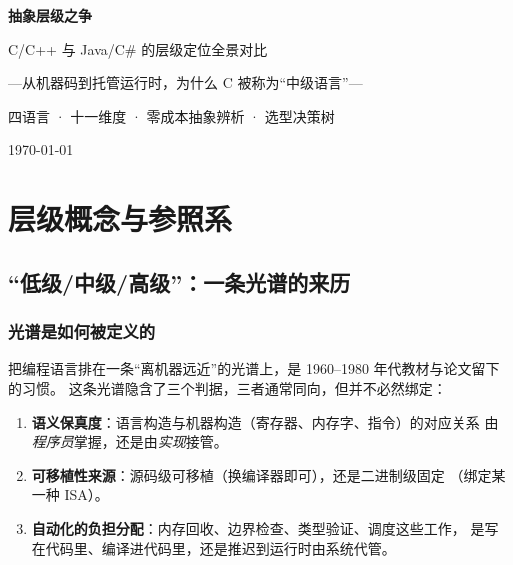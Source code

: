 \documentclass[12pt,a4paper,fontset=fandol]{ctexbook}
\begin{document}
\frontmatter

\begin{titlepage}
\centering
\vspace*{3.5cm}
{\Huge\bfseries 抽象层级之争\par}
\vspace{0.8cm}
{\LARGE C/C++ 与 Java/C\# 的层级定位全景对比\par}
\vspace{0.5cm}
{\large ---从机器码到托管运行时，为什么 C 被称为``中级语言''---\par}
\vfill
{\normalsize 四语言 · 十一维度 · 零成本抽象辨析 · 选型决策树\par}
\vspace{0.5cm}
{\large \today\par}
\end{titlepage}

\tableofcontents

\mainmatter

\part{层级概念与参照系}

\chapter{``低级/中级/高级''：一条光谱的来历}

\section{光谱是如何被定义的}

把编程语言排在一条``离机器远近''的光谱上，是 1960--1980 年代教材与论文留下的习惯。
这条光谱隐含了三个判据，三者通常同向，但并不必然绑定：

\begin{enumerate}
  \item \textbf{语义保真度}：语言构造与机器构造（寄存器、内存字、指令）的对应关系
        由\emph{程序员}掌握，还是由\emph{实现}接管。
  \item \textbf{可移植性来源}：源码级可移植（换编译器即可），还是二进制级固定
        （绑定某一种 ISA）。
  \item \textbf{自动化的负担分配}：内存回收、边界检查、类型验证、调度这些工作，
        是写在代码里、编译进代码里，还是推迟到运行时由系统代管。
\end{enumerate}
\end{document}
